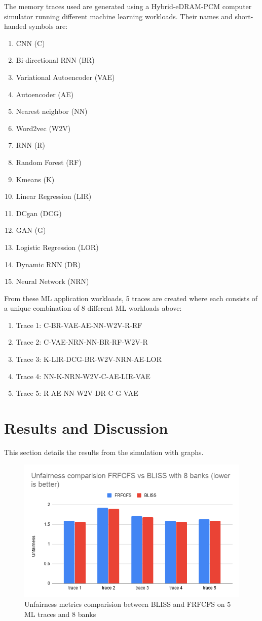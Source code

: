 \documentclass[letterpaper, 11pt]{article}
\begin{document}
The memory traces used are generated using a Hybrid-eDRAM-PCM computer simulator running different machine learning workloads. Their names and short-handed symbols are:

\begin{enumerate}
	\item CNN (C)
	\item Bi-directional RNN (BR)
	\item Variational Autoencoder (VAE)
	\item Autoencoder (AE)
	\item Nearest neighbor (NN)
	\item Word2vec (W2V)
	\item RNN (R)
	\item Random Forest (RF)
	\item Kmeans (K)
	\item Linear Regression (LIR)
	\item DCgan (DCG)
	\item GAN (G)
	\item Logistic Regression (LOR)
	\item Dynamic RNN (DR)
	\item Neural Network (NRN)
\end{enumerate}

From these ML application workloads, 5 traces are created where each consists of a unique combination of 8 different ML workloads above:

\begin{enumerate}
	\item Trace 1: C-BR-VAE-AE-NN-W2V-R-RF
	\item Trace 2: C-VAE-NRN-NN-BR-RF-W2V-R
	\item Trace 3: K-LIR-DCG-BR-W2V-NRN-AE-LOR
	\item Trace 4: NN-K-NRN-W2V-C-AE-LIR-VAE
	\item Trace 5: R-AE-NN-W2V-DR-C-G-VAE
\end{enumerate}

\section{Results and Discussion}

This section details the results from the simulation with graphs.

\begin{figure}[htb!]
	\centering
	\includegraphics[width=0.7\linewidth]{unfair_8banks.png}
	\caption{Unfairness metrics comparision between BLISS and FRFCFS on 5 ML traces and 8 banks}
	\label{fig1}
\end{figure}
\end{document}
